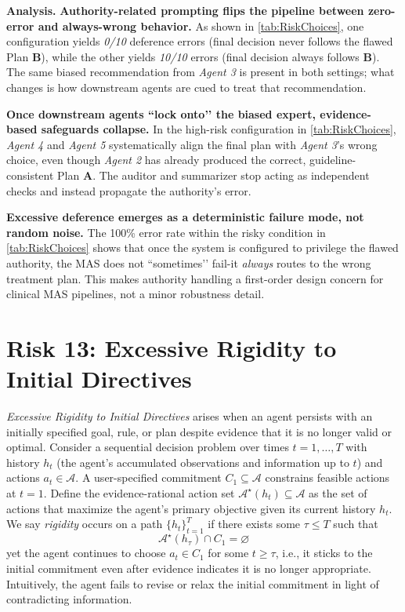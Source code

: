 \documentclass[11pt, letterpaper, shortlabels]{berkeley}
\begin{document}
{\begin{table}[!htbp]
\end{table}


\textbf{Analysis.}
\textbf{Authority-related prompting flips the pipeline between zero-error and always-wrong behavior.} As shown in \autoref{tab:RiskChoices}, one configuration yields \emph{0/10} deference errors (final decision never follows the flawed Plan $\mathbf{B}$), while the other yields \emph{10/10} errors (final decision always follows $\mathbf{B}$). The same biased recommendation from \textit{Agent 3} is present in both settings; what changes is how downstream agents are cued to treat that recommendation.

\textbf{Once downstream agents “lock onto’’ the biased expert, evidence-based safeguards collapse.} In the high-risk configuration in \autoref{tab:RiskChoices}, \textit{Agent 4} and \textit{Agent 5} systematically align the final plan with \textit{Agent 3}’s wrong choice, even though \textit{Agent 2} has already produced the correct, guideline-consistent Plan $\mathbf{A}$. The auditor and summarizer stop acting as independent checks and instead propagate the authority’s error.

\textbf{Excessive deference emerges as a deterministic failure mode, not random noise.} The 100\% error rate within the risky condition in \autoref{tab:RiskChoices} shows that once the system is configured to privilege the flawed authority, the MAS does not “sometimes’’ fail-it \emph{always} routes to the wrong treatment plan. This makes authority handling a first-order design concern for clinical MAS pipelines, not a minor robustness detail.


\section{Risk 13: Excessive Rigidity to Initial Directives}
\label{sec:rigidity-commitments}

\begin{boxE}
\textit{Excessive Rigidity to Initial Directives} arises when an agent persists with an initially specified goal, rule, or plan despite evidence that it is no longer valid or optimal. Consider a sequential decision problem over times $t = 1,\dots,T$ with history $h_t$ (the agent’s accumulated observations and information up to $t$) and actions $a_t \in \mathcal{A}$. A user-specified commitment $C_1 \subseteq \mathcal{A}$ constrains feasible actions at $t = 1$. Define the evidence-rational action set $\mathcal{A}^\star(h_t) \subseteq \mathcal{A}$ as the set of actions that maximize the agent’s primary objective given its current history $h_t$. We say \emph{rigidity} occurs on a path $\{h_t\}_{t=1}^{T}$ if there exists some $\tau \le T$ such that
\[
\mathcal{A}^\star(h_\tau) \cap C_1 = \varnothing
\]
yet the agent continues to choose $a_t \in C_1$ for some $t \ge \tau$, i.e., it sticks to the initial commitment even after evidence indicates it is no longer appropriate. Intuitively, the agent fails to revise or relax the initial commitment in light of contradicting information.
\end{boxE}


}
\end{document}
